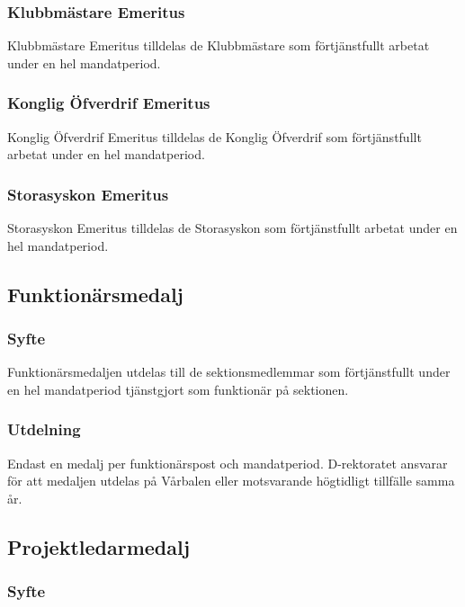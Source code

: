 \documentclass{dgovdoc}
\begin{document}
\subsubsection{Klubbmästare Emeritus}

Klubbmästare Emeritus tilldelas de Klubbmästare som förtjänstfullt arbetat
under en hel mandatperiod.

\subsubsection{Konglig Öfverdrif Emeritus}

Konglig Öfverdrif Emeritus tilldelas de Konglig Öfverdrif som förtjänstfullt
arbetat under en hel mandatperiod.

\subsubsection{Storasyskon Emeritus}

Storasyskon Emeritus tilldelas de Storasyskon som förtjänstfullt arbetat under
en hel mandatperiod.

\subsection{Funktionärsmedalj}

\subsubsection{Syfte}

Funktionärsmedaljen utdelas till de sektionsmedlemmar som förtjänstfullt under
en hel mandatperiod tjänstgjort som funktionär på sektionen.

\subsubsection{Utdelning}

Endast en medalj per funktionärspost och mandatperiod. D-rektoratet ansvarar för att medaljen utdelas på
Vårbalen eller motsvarande högtidligt tillfälle samma år.

\subsection{Projektledarmedalj}

\subsubsection{Syfte}
\end{document}
